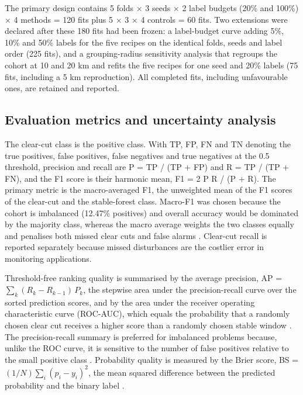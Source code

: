 \documentclass[11pt,a4paper]{article}
\begin{document}
The primary design contains 5 folds $\times$ 3 seeds $\times$ 2 label budgets (20\% and 100\%) $\times$ 4 methods = 120 fits plus 5 $\times$ 3 $\times$ 4 controls = 60 fits. Two extensions were declared after these 180 fits had been frozen: a label-budget curve adding 5\%, 10\% and 50\% labels for the five recipes on the identical folds, seeds and label order (225 fits), and a grouping-radius sensitivity analysis that regroups the cohort at 10 and 20 km and refits the five recipes for one seed and 20\% labels (75 fits, including a 5 km reproduction). All completed fits, including unfavourable ones, are retained and reported.

\subsection{Evaluation metrics and uncertainty analysis}
The clear-cut class is the positive class. With TP, FP, FN and TN denoting the true positives, false positives, false negatives and true negatives at the 0.5 threshold, precision and recall are P = TP / (TP + FP) and R = TP / (TP + FN), and the F1 score is their harmonic mean, F1 = 2 P R / (P + R). The primary metric is the macro-averaged F1, the unweighted mean of the F1 scores of the clear-cut and the stable-forest class. Macro-F1 was chosen because the cohort is imbalanced (12.47\% positives) and overall accuracy would be dominated by the majority class, whereas the macro average weights the two classes equally and penalises both missed clear cuts and false alarms \cite{ref31}. Clear-cut recall is reported separately because missed disturbances are the costlier error in monitoring applications.

Threshold-free ranking quality is summarised by the average precision, AP = $\sum_k (R_k - R_{k-1})\, P_k$, the stepwise area under the precision-recall curve over the sorted prediction scores, and by the area under the receiver operating characteristic curve (ROC-AUC), which equals the probability that a randomly chosen clear cut receives a higher score than a randomly chosen stable window \cite{ref34}. The precision-recall summary is preferred for imbalanced problems because, unlike the ROC curve, it is sensitive to the number of false positives relative to the small positive class \cite{ref33,ref32}. Probability quality is measured by the Brier score, BS = $(1/N)\sum_i (p_i - y_i)^2$, the mean squared difference between the predicted probability and the binary label \cite{ref35}.
\end{document}
